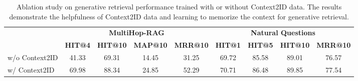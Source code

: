 \begin{table*}[htbp]
    \centering
    \small
    \caption{Ablation study on generative retrieval performances with or without the constraints-based synthetic queries.}
    \label{tab:constraints}
\end{table*}
\begin{table*}[htbp]

    \centering
    \small
    \begin{tabular}{lcccccccc}
    \toprule
    & \multicolumn{4}{c}{\textbf{MultiHop-RAG}} & \multicolumn{4}{c}{\textbf{Natural Questions}} \\\cmidrule(lr){2-5}\cmidrule(lr){6-9}
    & \textbf{HIT@4} & \textbf{HIT@10} & \textbf{MAP@10} & \textbf{MRR@10} & \textbf{HIT@1} & \textbf{HIT@5} & \textbf{HIT@10} & \textbf{MRR@10} \\
    \midrule
    w/o Context2ID &41.33 &69.31 &14.45 &31.25 & 69.72 & 85.58 & 89.01 & 76.57\\
    w/ Context2ID &69.98& 88.34 &24.85 & 52.29 & 70.71 & 86.48 & 89.85 & 77.54\\
    \bottomrule
    \end{tabular}
    \caption{Ablation study on generative retrieval performance trained with or without Context2ID data. The results demonstrate the helpfulness of Context2ID data and learning to memorize the context for generative retrieval.}
    \label{tab:context2id}
\end{table*}


